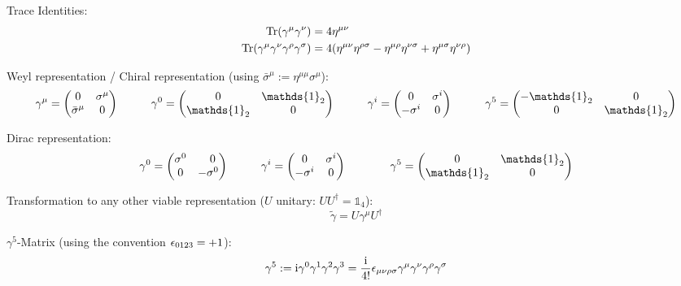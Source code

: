 			\noindent
			Trace Identities:
			\begin{align}
				\Tr(\gamma^\mu \gamma^\nu) &= 4 \eta^{\mu\nu} \\
				\Tr(\gamma^\mu \gamma^\nu \gamma^\rho \gamma^\sigma) &= 4\qty(\eta^{\mu\nu}\eta^{\rho\sigma} - \eta^{\mu\rho}\eta^{\nu\sigma} + \eta^{\mu\sigma}\eta^{\nu\rho})
			\end{align}

			\noindent
			Weyl representation / Chiral representation  (using $\bar{\sigma}^\mu := \eta^{\mu\mu}\sigma^\mu$):
			\begin{equation}
				\gamma^\mu = \mqty(
				0 & \sigma^\mu \\
				\bar{\sigma}^\mu & 0
				)
				\hsp
				\gamma^0 = \mqty(
				0 & \mathds{1}_2 \\
				\mathds{1}_2 & 0
				)
				\hsp
				\gamma^i = \mqty(
				0 & \sigma^i \\
				-\sigma^i & 0
				)
				\hsp
				\gamma^5 = \mqty(
				-\mathds{1}_2 & 0 \\
				0 & \mathds{1}_2
				)
			\end{equation}

			\noindent
			Dirac representation:
			\begin{equation}
				\begin{aligned}
					\gamma^0
					= \left( \begin{matrix}
							\sigma^0 & \M0       \\
							0        & -\sigma^0
						\end{matrix} \right)
					&\hsp
					\gamma^i = \mqty(
					0 & \sigma^i \\
					-\sigma^i & 0
					)
					&\hsp
					\gamma^5 = \mqty(
					0 & \mathds{1}_2 \\
					\mathds{1}_2 & 0
					)
				\end{aligned}
			\end{equation}

			\noindent
			Transformation to any other viable representation ($U$ unitary: $U U^\dagger=\mathds{1}_4$):
			\begin{equation}
				\tilde{\gamma} = U \gamma^\mu U^\dagger
			\end{equation}

			\noindent
			$\gamma^5$-Matrix (using the convention $\epsilon_{0123} = +1$):
			\begin{equation}
				\gamma^5 := \mathrm{i}\gamma^0 \gamma^1 \gamma^2 \gamma^3
				= \frac{\mathrm{i}}{4!}\epsilon_{\mu\nu\rho\sigma} \gamma^\mu \gamma^\nu \gamma^\rho \gamma^\sigma
			\end{equation}


